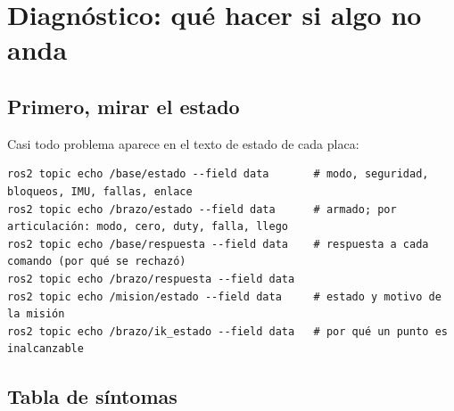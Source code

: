 \chapter{Diagnóstico: qué hacer si algo no anda}\label{cap:diag}

\section{Primero, mirar el estado}
Casi todo problema aparece en el texto de estado de cada placa:
\begin{lstlisting}[language=consola]
ros2 topic echo /base/estado --field data       # modo, seguridad, bloqueos, IMU, fallas, enlace
ros2 topic echo /brazo/estado --field data      # armado; por articulación: modo, cero, duty, falla, llego
ros2 topic echo /base/respuesta --field data    # respuesta a cada comando (por qué se rechazó)
ros2 topic echo /brazo/respuesta --field data
ros2 topic echo /mision/estado --field data     # estado y motivo de la misión
ros2 topic echo /brazo/ik_estado --field data   # por qué un punto es inalcanzable
\end{lstlisting}

\section{Tabla de síntomas}

